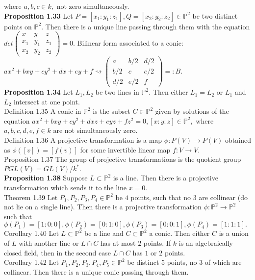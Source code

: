 \documentclass[8pt]{extarticle}
\begin{document}
where $a, b, c \in k,$ not zero simultaneously.\\
\textbf{Proposition 1.33} Let $P = [x_1 : y_1 : z_1], Q = [x_2 : y_2 : z_2] \in \mathbb{P}^2$ be two distinct points on $\mathbb{P}^2.$ Then there is a unique line passing through them with the equation $det\begin{pmatrix}
x & y & z\\
x_1 & y_1 & z_1\\
x_2 & y_2 & z_2
\end{pmatrix}=0.$ Bilinear form associated to a conic: $ax^2 +bxy+cy^2 +dx+ey+f \rightsquigarrow \begin{pmatrix}
a & b/2 & d/2\\
b/2 & c & e/2\\
d/2 & e/2 & f
\end{pmatrix} =: B .$\\
\textbf{Proposition 1.34} Let $L_1, L_2$ be two lines in $\mathbb{P}^2.$ Then either $L_1 = L_2$ or $L_1$ and $L_2$ intersect at one point.\\
Definition 1.35 A conic in $\mathbb{P}^2$ is the subset $C\in \mathbb{P}^2$ given by solutions of the equation
$ax^2 +bxy+cy^2 +dxz+eyz+fz^2 =0, [x:y:z]\in\mathbb{P}^2,$ where $a, b, c, d, e, f \in k$ are not simultaneously zero.\\
Definition 1.36 A projective transformation is a map $\phi : P(V ) \rightarrow P(V )$ obtained as
$\phi([v]) = [f(v)]$ for some invertible linear map $f : V \rightarrow V.$\\
Proposition 1.37 The group of projective transformations is the quotient group $PGL(V ) = GL(V )/k^*.$\\
\textbf{Proposition 1.38} Suppose $L \subset \mathbb{P}^2$ is a line. Then there is a projective transformation which sends it to the line $x = 0.$\\
Theorem 1.39 Let $P_1,P_2,P_3,P_4 \in \mathbb{P}^2$ be $4$ points, such that no $3$ are collinear (do not lie on a single line). Then there is a projective transformation $\phi: \mathbb{P}^2 \rightarrow \mathbb{P}^2$ such that
$\phi(P_1)=[1:0:0], \phi(P_2)=[0:1:0], \phi(P_3)=[0:0:1], \phi(P_4)=[1:1:1].$\\
Corollary 1.40 Let $L \subset \mathbb{P}^2$ be a line and $C \subset \mathbb{P}^2$ a conic. Then either $C$ is a union of $L$ with another line or $L \cap C$ has at most $2$ points. If $k$ is an algebraically closed field, then in the second case $L \cap C$ has $1$ or $2$ points.\\
Corollary 1.42 Let $P_1, P_2, P_3, P_4, P_5 \in \mathbb{P}^2$ be distinct $5$ points, no $3$ of which are collinear. Then there is a unique conic passing through them.\\
\end{document}
